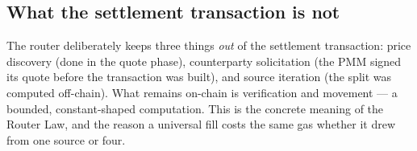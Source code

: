 \subsection{What the settlement transaction is not}

The router deliberately keeps three things \emph{out} of the settlement
transaction: price discovery (done in the quote phase), counterparty
solicitation (the PMM signed its quote before the transaction was built),
and source iteration (the split was computed off-chain). What remains
on-chain is verification and movement --- a bounded, constant-shaped
computation. This is the concrete meaning of the Router Law, and the reason
a universal fill costs the same gas whether it drew from one source or four.
